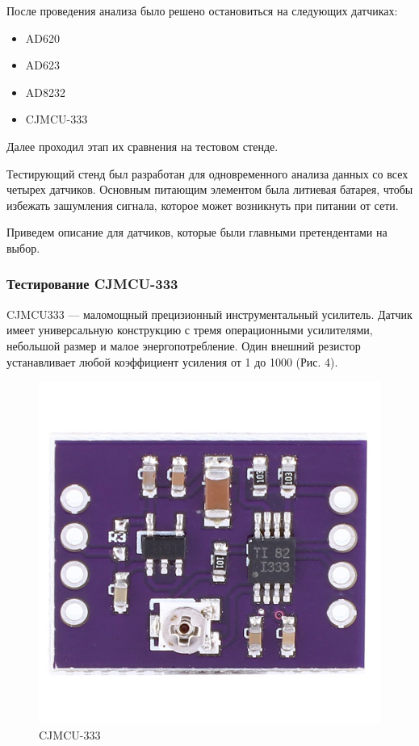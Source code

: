 \documentclass[12pt, russian]{extarticle}
\begin{document}
\begin{spacing}{1.5}
После проведения анализа было решено остановиться на следующих датчиках: 

\begin{itemize}
    \item AD620
    \item AD623
    \item AD8232
    \item CJMCU-333
\end{itemize}

Далее проходил этап их сравнения на тестовом стенде.

Тестирующий стенд был разработан для одновременного анализа данных со всех четырех датчиков.
Основным питающим элементом была литиевая батарея, чтобы избежать зашумления сигнала, которое может возникнуть при питании от сети.

Приведем описание для датчиков, которые были главными претендентами на выбор.

\subsubsection{Тестирование CJMCU-333}

CJMCU333 — маломощный прецизионный инструментальный усилитель. Датчик имеет универсальную конструкцию с тремя операционными усилителями, небольшой размер и малое энергопотребление. Один внешний резистор устанавливает любой коэффициент усиления от 1 до 1000 (Рис. 4).

\begin{figure}[htbp]
\centering
\includegraphics[scale=0.15]{resources/cjmcu333/cjmcu-333.png}
\caption{CJMCU-333}
\label{fig:my_label}
\end{figure}
\newpage


\end{spacing}
\end{document}
